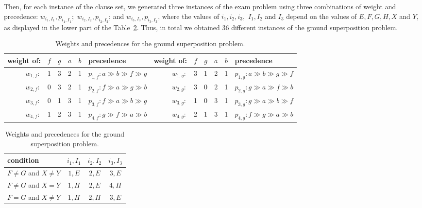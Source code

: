 Then, for each instance of the clause set, we generated three instances of the exam problem
using three combinations of weight and precedence: $w_{i_1, I_1}, p_{i_1,I_1}$;\,
$w_{i_2, I_2}, p_{i_2, I_2}$; and $w_{i_3, I_3}, p_{i_3, I_3}$, where
the values of $i_1, i_2, i_3,$ $I_1, I_2$ and $I_3$ depend on the values of $E, F, G, H, X$ and $Y$,
as displayed in the lower part of the Table~\ref{tab:ground-sup}.
Thus, in total we obtained 36 different instances of the ground superposition problem.

\begin{table}
\begin{center}
\begin{tabular}{r@{\hskip 0.5em}c c c c@{\hskip 0.5em} |@{\hskip 0.5em} l@{\hskip 1em} ||@{\hskip 0.5em} r@{\hskip 0.5em} c c c c@{\hskip 0.5em} |@{\hskip 0.5em} l}
  weight of: & $f$ & $g$ & $a$ & $b$ & precedence
  & weight of: & $f$ & $g$ & $a$ & $b$ & precedence \\ \hline
  $w_{1,f}:$  & 1   & 3   & 2   & 1   & $p_{1,f}: a \gg b \gg f \gg g$ &
  $w_{1,g}:$  & 3   & 1   & 2   & 1   & $p_{1,g}: a \gg b \gg g \gg f$ \\ \hline
  $w_{2,f}:$  & 0   & 3   & 2   & 1   & $p_{2,f}: f \gg a \gg g \gg b$ &
  $w_{2,g}:$  & 3   & 0   & 2   & 1   & $p_{2,g}: g \gg a \gg f \gg b$ \\ \hline
  $w_{3,f}:$  & 0   & 1   & 3   & 1   & $p_{3,f}: f \gg a \gg b \gg g$ &
  $w_{3,g}:$  & 1   & 0   & 3   & 1   & $p_{3,g}: g \gg a \gg b \gg f$ \\ \hline
  $w_{4,f}:$  & 1   & 2   & 3   & 1   & $p_{4,f}: g \gg f \gg a \gg b$ &
  $w_{4,g}:$  & 2   & 1   & 3   & 1   & $p_{4,g}: f \gg g \gg a \gg b$ \\ \hline
\end{tabular}

\hspace*{0.5em}

\begin{tabular}{l@{\hskip 1.05em} || c | c | c}
\hline
condition & $i_1, I_1$ & $i_2, I_2$ & $i_3, I_3$ \\ \hline
$F \not = G$ and $X \not= Y$ & $1,E$ & $2, E$ & $3, E$ \\
$F \not = G$ and $X = Y$ & $1, H$ & $2, E$ & $4, H$ \\
$F = G$ and $X \not= Y$ & $1, H$ & $2, H$ & $3, E$
\end{tabular}
\hspace*{0.5em}
\caption{Weights and precedences for the ground superposition problem.}
\end{center}
\label{tab:ground-sup}
\end{table}
